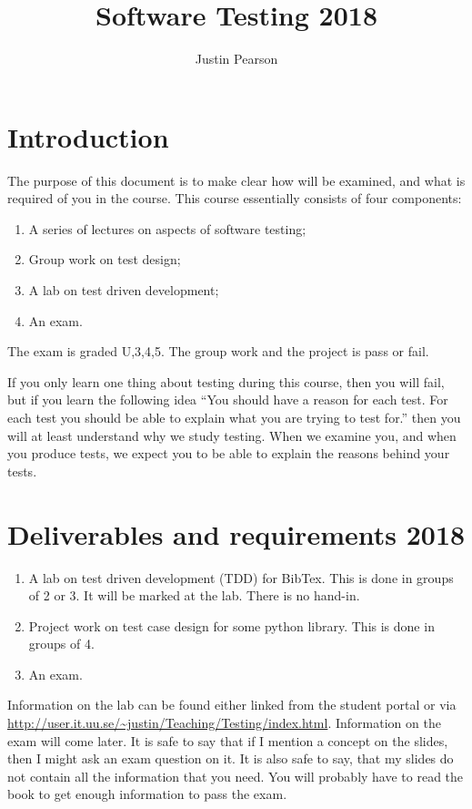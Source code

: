 \documentclass[a4page]{article}
\title{Software Testing 2018}
\author{Justin Pearson}
\begin{document}
\maketitle



\section{Introduction}
The purpose of this document is to make clear how will be examined, and
what is required of you in the course.  This course essentially consists of
four components:
\begin{enumerate}
\item A series of lectures on aspects of software testing;
\item Group work on test design;
\item A lab on test driven development;
\item An exam.
\end{enumerate}
The exam is graded U,3,4,5. The group work and the project is pass or fail.

If you only learn one thing about testing during this course, then you will
fail, but if you learn the following idea ``You should have a reason for each
test. For each test you should be able to explain what you are trying to test
for.'' then you will at least understand why we study testing. When we examine
you, and when you produce tests, we expect you to be able to explain the
reasons behind your tests.


\section{Deliverables and requirements  2018}



\begin{enumerate}
\item A lab on  test driven development (TDD) for  BibTex.   This is
  done in groups of 2 or 3. It will be marked at the lab. There is no
  hand-in. 


\item Project work on test case design for some python library. This
  is done in groups of 4.
\item An exam.

  \end{enumerate}


  Information on the lab can be found either linked from the student portal or
  via
  \url{http://user.it.uu.se/~justin/Teaching/Testing/index.html}. Information
  on the exam will come later. It is safe to say that if I mention a concept
  on the slides, then I might ask an exam question on it. It is also safe to
  say, that my slides do not contain all the information that you need. You
  will probably have to read the book to get enough information to pass the
  exam.
\end{document}
